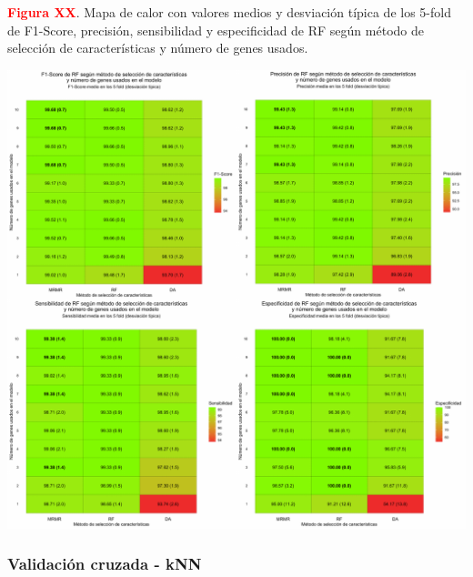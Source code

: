 \textbf{\textcolor{red}{Figura XX}}. Mapa de calor con valores medios y desviación típica de los 5-fold de F1-Score, precisión, sensibilidad y especificidad de RF según método de selección de características y número de genes usados.
\begin{center}
	\includegraphics[width=1\textwidth]{figuras/higado_biclase_heatmap_rf.pdf} \\
\end{center}

\newpage
\subsubsection{Validación cruzada - kNN}

